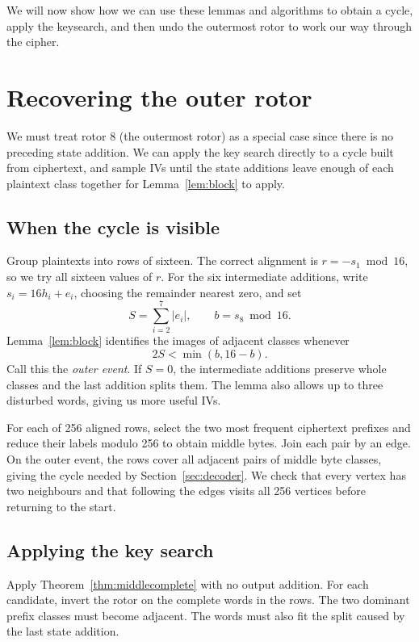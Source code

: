 \documentclass[11pt]{article}
\begin{document}
We will now show how we can use these lemmas and algorithms to obtain a cycle, apply the keysearch, and then undo the outermost rotor to work our way through the cipher.


\section{Recovering the outer rotor}\label{sec:outer}
We must treat rotor 8 (the outermost rotor) as a special case since there is no preceding state addition. We can apply the key search directly to a cycle built
from ciphertext, and sample IVs until the state additions leave enough
of each plaintext class together for Lemma~\ref{lem:block} to apply.

\subsection{When the cycle is visible}
Group plaintexts into rows of sixteen. The correct alignment is
\(r=-s_1\bmod16\), so we try all sixteen values of \(r\).
For the six intermediate additions, write \(s_i=16h_i+e_i\),
choosing the remainder nearest zero, and set
\[
 S=\sum_{i=2}^7|e_i|,\qquad b=s_8\bmod16.
\]
Lemma~\ref{lem:block} identifies the images of adjacent classes whenever
\begin{equation}
 2S<\min(b,16-b).
 \label{eq:outerevent}
\end{equation}
Call this the \emph{outer event}. If \(S=0\), the intermediate additions
preserve whole classes and the last addition splits them. The lemma
also allows up to three disturbed words, giving us more useful IVs.

For each of 256 aligned rows, select the two most frequent ciphertext
prefixes and reduce their labels modulo 256 to obtain middle bytes.
Join each pair by an edge. On the outer event, the rows cover all
adjacent pairs of middle byte classes, giving the cycle needed by
Section~\ref{sec:decoder}. We check that every vertex has two neighbours
and that following the edges visits all 256 vertices before returning
to the start.

\subsection{Applying the key search}
Apply Theorem~\ref{thm:middlecomplete} with no output addition. For each
candidate, invert the rotor on the complete words in the rows.
The two dominant prefix classes must become adjacent. The words must
also fit the split caused by the last state addition.
\end{document}
